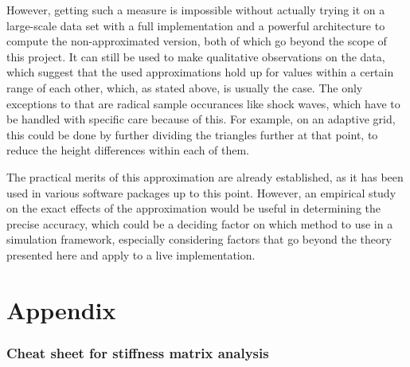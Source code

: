 \documentclass{article}
\begin{document}
However, getting such a measure is impossible without actually trying it on a large-scale data set with a full implementation and a powerful architecture to compute the non-approximated version, both of which go beyond the scope of this project. It can still be used to make qualitative observations on the data, which suggest that the used approximations hold up for values within a certain range of each other, which, as stated above, is usually the case. The only exceptions to that are radical sample occurances like shock waves, which have to be handled with specific care because of this. For example, on an adaptive grid, this could be done by further dividing the triangles further at that point, to reduce the height differences within each of them.

The practical merits of this approximation are already established, as it has been used in various software packages up to this point. However, an empirical study on the exact effects of the approximation would be useful in determining the precise accuracy, which could be a deciding factor on which method to use in a simulation framework, especially considering factors that go beyond the theory presented here and apply to a live implementation.

\clearpage




\appendix

\clearpage{}
\part{Appendix}
\label{part:cheat-sheet}

\section{Cheat sheet for stiffness matrix analysis}
\label{sec:cheat-sheet-stiffn}

\newenvironment{meine}{}{}
\newcommand{\mypmatrix}[1]
{
  \begin{meine}
    \renewcommand{\arraystretch}{1}
    \begin{pmatrix}
      #1
    \end{pmatrix}
    \renewcommand{\arraystretch}{2}
  \end{meine}
}
\end{document}
